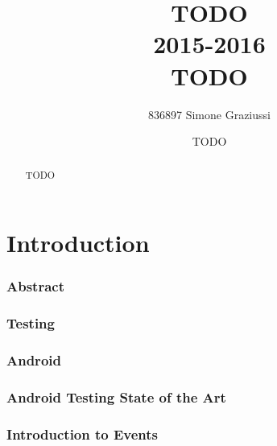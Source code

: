 \documentclass[11pt,a4paper,notitlepage]{article}
\title{\Large{TODO\\2015-2016}\\\Huge{TODO}}
\author{836897 Simone Graziussi}
\date{TODO}
\begin{document}
\sloppy


\begin{titlingpage}
    \maketitle
    \begin{abstract}
        \large{TODO}
    \end{abstract}
\end{titlingpage}



\newpage
\tableofcontents
\newpage



\part{Introduction}

\section{Abstract}

\section{Testing}

\section{Android}

\section{Android Testing State of the Art}

\section{Introduction to Events}
\end{document}

